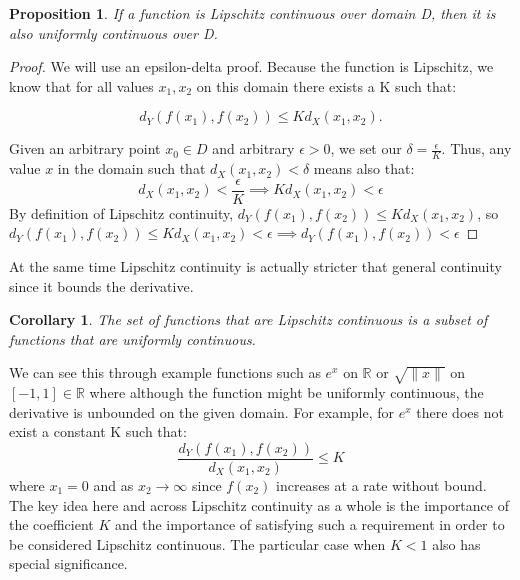 \documentclass{article}
\newtheorem{corollary}{Corollary}[theorem]
\newtheorem{proposition}[theorem]{Proposition}
\theoremstyle{remark}
\begin{document}
\begin{proposition}If a function is Lipschitz continuous over domain D, then it is also uniformly continuous over D.\\
\end{proposition}

\begin{proof} We will use an epsilon-delta proof. Because the function is Lipschitz, we know that for all values $x_1, x_2$ on this domain there exists a K such that:

$$d_Y(f(x_1),f(x_2)) \leq Kd_X(x_1,x_2).$$

Given an arbitrary point $x_0 \in D$ and arbitrary $\epsilon >0$, we set our $\delta = \frac{\epsilon}{K}$. Thus, any value $x$ in the domain such that $d_X(x_1,x_2)<\delta$ means also that:
$$d_X(x_1,x_2)<\frac{\epsilon}{K} \implies Kd_X(x_1,x_2)<\epsilon$$
By definition of Lipschitz continuity, $d_Y(f(x_1),f(x_2)) \leq Kd_X(x_1,x_2)$, so \\

$d_Y(f(x_1),f(x_2)) \leq Kd_X(x_1,x_2) < \epsilon \implies d_Y(f(x_1),f(x_2))< \epsilon$

\end{proof}

At the same time Lipschitz continuity is actually stricter that general continuity since it bounds the derivative. \\

\begin{corollary} 
The set of functions that are Lipschitz continuous is a subset of functions that are uniformly continuous.
\end{corollary}

We can see this through example functions such as $e^x$ on $\mathbb{R}$ or $\sqrt{\|x\|}$ on $[-1,1] \in \mathbb{R}$ where although the function might be uniformly continuous, the derivative is unbounded on the given domain. For example, for $e^x$ there does not exist a constant K such that: $$\frac{d_Y(f(x_1),f(x_2))}{d_X(x_1, x_2)} \leq K$$
where $x_1 = 0$ and as $x_2 \to \infty$ since $f(x_2)$ increases at a rate without bound. \\


The key idea here and across Lipschitz continuity as a whole is the importance of the coefficient $K$ and the importance of satisfying such a requirement in order to be considered Lipschitz continuous. The particular case when $K < 1$ also has special significance. \\
\end{document}
